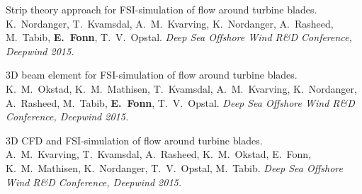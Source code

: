 \documentclass[line,margin]{res}
\begin{document}
\begin{resume}
Strip theory approach for FSI-simulation of flow around turbine blades. \\
K.~Nordanger, T.~Kvamsdal, A.~M.~Kvarving, K.~Nordanger, A.~Rasheed, M.~Tabib,
{\bf E.~Fonn}, T.~V.~Opstal.
{\em {} Deep Sea Offshore Wind R\&D Conference, Deepwind 2015.}

3D beam element for FSI-simulation of flow around turbine blades. \\
K.~M.~Okstad, K.~M.~Mathisen, T.~Kvamsdal, A.~M.~Kvarving, K.~Nordanger,
A.~Rasheed, M.~Tabib, {\bf E.~Fonn}, T.~V.~Opstal.
{\em {} Deep Sea Offshore Wind R\&D Conference, Deepwind 2015.}

3D CFD and FSI-simulation of flow around turbine blades. \\
A.~M.~Kvarving, T.~Kvamsdal, A.~Rasheed, K.~M.~Okstad, E.~Fonn, K.~M.~Mathisen,
K.~Nordanger, T.~V.~Opstal, M.~Tabib.
{\em {} Deep Sea Offshore Wind R\&D Conference, Deepwind 2015.}


\end{resume}
\end{document}
